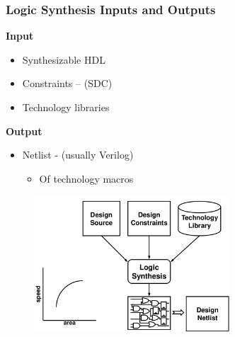 \documentclass[t, notes, xcolor=table]{beamer}
\begin{document}
\begin{frame}
\frametitle{Logic Synthesis Inputs and Outputs}
\begin{multicols}{2}
\textbf{Input}
\begin{itemize}
\item Synthesizable HDL
\item Constraints – (SDC)
\item Technology libraries
\end{itemize}
\vfill
\columnbreak

\textbf{Output}

\begin{itemize}
\item Netlist - (usually Verilog)

\begin{itemize}
	\item Of technology macros
\end{itemize}

\end{itemize}

\end{multicols}
\begin{figure}
    \includegraphics[width=0.65\textwidth]{img/17_synth_inouts.png}
\end{figure}
\end{frame}
\end{document}
